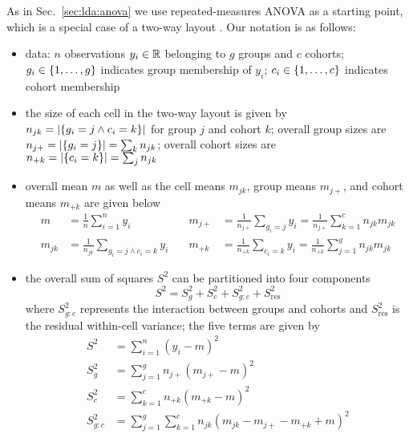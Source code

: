 \documentclass[a4paper]{article}
\begin{document}
As in Sec.~\ref{sec:lda:anova} we use repeated-measures ANOVA as a starting point, which is a special case of a two-way layout \citep[772-781]{Bishop:06}. Our notation is as follows:
\begin{itemize}
\item data: $n$ observations $y_i\in \mathbb{R}$ belonging to $g$ groups and $c$ cohorts; $g_i\in \left\{1,\ldots,g\right\}$ indicates group membership of $y_i$; $c_i\in \left\{1,\ldots, c\right\}$ indicates cohort membership
\item the size of each cell in the two-way layout is given by $n_{jk} = \left\lvert\left\{g_i = j \wedge c_i = k\right\}\right\rvert$ for group $j$ and cohort $k$; overall group sizes are $n_{j+} = \left\lvert\left\{g_i = j\right\}\right\rvert = \sum_k n_{jk}$; overall cohort sizes are $n_{+k} = \left\lvert\left\{c_i = k\right\}\right\rvert = \sum_j n_{jk}$
\item overall mean $m$ as well as the cell means $m_{jk}$, group means $m_{j+}$, and cohort means $m_{+k}$ are given below
  \begin{equation}
    \label{eq:lda:ranova:means}
    \begin{aligned}
      m &= \frac1n \sum_{i=1}^n y_i
      &\quad m_{j+} &= \frac1{n_{j+}} \sum_{g_i = j} y_i = \frac1{n_{j+}} \sum_{k=1}^c n_{jk} m_{jk} \\
      m_{jk} &= \frac1{n_{jk}} \sum_{g_i = j \wedge c_i = k} y_i 
      &\quad m_{+k} &= \frac1{n_{+k}} \sum_{c_i = k} y_i = \frac1{n_{+k}} \sum_{j=1}^g n_{jk} m_{jk} 
    \end{aligned}
  \end{equation}
\item the overall sum of squares $S^2$ can be partitioned into four components
  \begin{equation}
    \label{eq:lda:ranova:ss-partition}
    S^2 = S_g^2 + S^2_c + S^2_{g:c} + S^2_{\text{res}}
  \end{equation}
  where $S^2_{g:c}$ represents the interaction between groups and cohorts and $S^2_{\text{res}}$ is the residual within-cell variance; the five terms are given by
  \begin{equation}
    \label{eq:lda:ranova:ss-terms}
    \begin{split}
      S^2 &= \sum_{i=1}^n (y_i - m)^2 \\
      S^2_g &= \sum_{j=1}^g n_{j+} (m_{j+} - m)^2 \\
      S^2_c &= \sum_{k=1}^c n_{+k} (m_{+k} - m)^2 \\
      S^2_{g:c} &= \sum_{j=1}^g \sum_{k=1}^c n_{jk} (m_{jk} - m_{j+} - m_{+k} + m)^2 \\

\end{split}
\end{equation}
\end{itemize}
\end{document}
